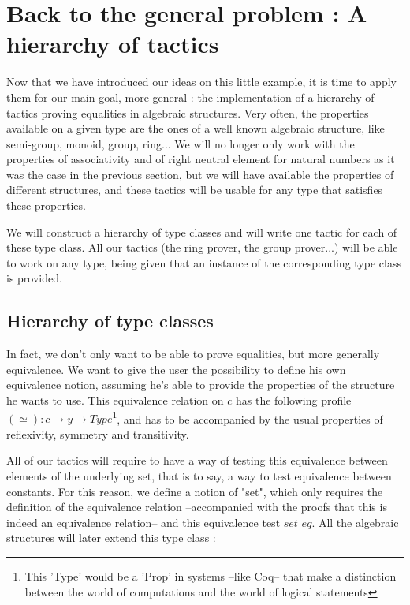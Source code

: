 \section {Back to the general problem : A hierarchy of tactics}

Now that we have introduced our ideas on this little example, it is time to apply them for our main goal, more general : the implementation of a hierarchy of tactics proving equalities in algebraic structures. Very often, the properties available on a given type are the ones of a well known algebraic structure, like semi-group, monoid, group, ring...  We will no longer only work with the properties of associativity and of right neutral element for natural numbers as it was the case in the previous section, but we will have available the properties of different structures, and these tactics will be usable for any type that satisfies these properties.

We will construct a hierarchy of type classes and will write one tactic for each of these type class. All our tactics (the ring prover, the group prover...) will be able to work on any type, being given that an instance of the corresponding type class is provided.

\subsection {Hierarchy of type classes}

In fact, we don't only want to be able to prove equalities, but more generally equivalence. We want to give the user the possibility to define his own equivalence notion, assuming he's able to provide the properties of the structure he wants to use. This equivalence relation on $c$ has the following profile $(\simeq) : c \rightarrow y \rightarrow Type$\footnote{This 'Type' would be a 'Prop' in systems --like Coq-- that make a distinction between the world of computations and the world of logical statements}, and has to be accompanied by the usual properties of reflexivity, symmetry and transitivity.

All of our tactics will require to have a way of testing this equivalence between elements of the underlying set, that is to say, a way to test equivalence between constants. For this reason, we define a notion of "set", which only requires the definition of the equivalence relation --accompanied with the proofs that this is indeed an equivalence relation-- and this equivalence test $set\_eq$. All the algebraic structures will later extend this type class :

